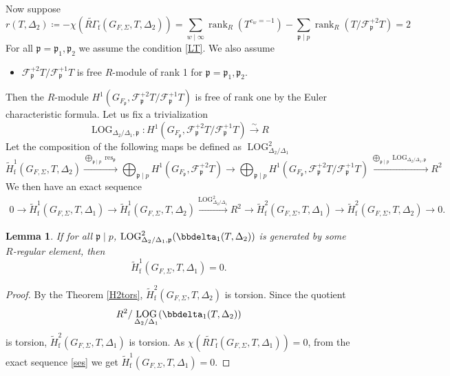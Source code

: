 \documentclass[10pt]{amsart}
\makeatletter
\numberwithin{equation}{section}
\newcommand{\mylabel}[2]{#2\def\@currentlabel{#2}\label{#1}}
\newtheorem{lemma}[thm]{Lemma}
\theoremstyle{definition}
\theoremstyle{remark} %
\DeclareMathOperator{\LOG}{LOG}
\DeclareMathOperator{\rank}{rank}
\DeclareMathOperator{\res}{res}
\newcommand{\scrF}{\mathscr{F}}
\newcommand{\p}{\mathfrak{p}}
\makeatother
\begin{document}
		\subsubsection{}
		Now suppose	
		$$
		r(T,\Delta_2) \coloneqq -\chi(\widetilde{R\Gamma}_{\mathrm{f}}(G_{F,\Sigma},T,\Delta_2)) = \sum_{w \mid \infty} \rank_R(T^{c_w = -1}) - \sum_{\p \mid p} \rank_R(T/\scrF^{+2}_{\p}T) =2 $$
		For all $\p= \p_1, \p_2 $ we assume the condition \ref{LT}. We also assume 
		\begin{itemize}
			\item[\mylabel{R1}{\textbf{(R1)}}] $ \scrF^{+2}_{\p}T/\scrF^{+1}_{\p}T $ is free $ R $-module of rank 1 for $ \p= \p_1, \p_2  $.
		\end{itemize}
		Then the $R$-module $H^1(G_{F_{\p}}, \scrF^{+2}_{\p}T/\scrF^{+1}_{\p}T)$ is free of rank one by the Euler characteristic formula. Let us fix a trivialization 
		$$ \LOG_{\Delta_2/\Delta_1 , \p} \colon H^1(G_{F_{\p}}, \scrF^{+2}_{\p}T/\scrF^{+1}_{\p}T) \xrightarrow{\sim} R $$
		Let the composition of the following maps be defined as $\LOG^2_{\Delta_2/\Delta_1}$
		$$  \widetilde{H}^1_{\mathrm{f}}(G_{F,\Sigma},T,\Delta_2) \xrightarrow{\bigoplus_{\p \mid p} \res_{\p}} \bigoplus_{\p \mid p} H^1(G_{F_{\p}}, \scrF^{+2}_{\p}T) \rightarrow \bigoplus_{\p \mid p} H^1(G_{F_{\p}}, \scrF^{+2}_{\p}T/\scrF^{+1}_{\p}T) \xrightarrow{\bigoplus_{\p \mid p}\LOG_{\Delta_2/\Delta_1 , \p} } R^2 $$
		We then have an exact sequence 
		\begin{multline*}
			0 \rightarrow \widetilde{H}^1_{\mathrm{f}}(G_{F,\Sigma},T,\Delta_1) \rightarrow \widetilde{H}^1_{\mathrm{f}}(G_{F,\Sigma},T,\Delta_2) \xrightarrow{\LOG^2_{\Delta_2/\Delta_1}} R^2
			\rightarrow \widetilde{H}^2_{\mathrm{f}}(G_{F,\Sigma},T,\Delta_1) \rightarrow \widetilde{H}^2_{\mathrm{f}}(G_{F,\Sigma},T,\Delta_2) \rightarrow 0.
		\end{multline*} 
		
		\begin{lemma}
			\label{logim}
			If for all $ \p \mid p $, $ \LOG^2_{\Delta_2/\Delta_1 , \p} (\bbdelta_1(T, \Delta_2)) $ is generated by some $ R $-regular element, then  $$ \widetilde{H}^1_{\mathrm{f}}(G_{F,\Sigma},T,\Delta_1) = 0.$$ 
		\end{lemma}	
		\begin{proof}
			
			By the Theorem \ref{H2tors}, $ \widetilde{H}^2_{\mathrm{f}}(G_{F,\Sigma},T,\Delta_2) $ is torsion. Since the quotient $$ R^2/\LOG_{\Delta_2/\Delta_1}(\bbdelta_1(T, \Delta_2)) $$	is torsion, $ \widetilde{H}^2_{\mathrm{f}}(G_{F,\Sigma},T,\Delta_1) $ is torsion. As $ \chi(\widetilde{R\Gamma}_{\mathrm{f}}(G_{F,\Sigma},T,\Delta_1)) =0 $, from the exact sequence \eqref{ses} we get $ \widetilde{H}^1_{\mathrm{f}}(G_{F,\Sigma},T,\Delta_1) = 0$.
		\end{proof}
		
\end{document}
